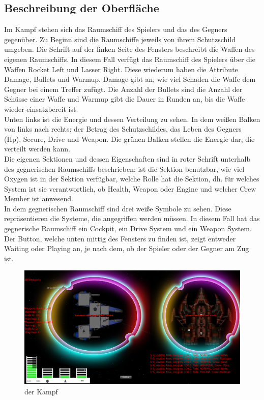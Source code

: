 \documentclass[fontsize=12pt,paper=a4,twoside]{scrartcl}
\begin{document}
\subsection{Beschreibung der Oberfläche}
Im Kampf stehen sich das Raumschiff des Spielers und das des Gegners gegenüber.
Zu Beginn sind die Raumschiffe jeweils von ihrem Schutzschild umgeben.
Die Schrift auf der linken Seite des Fensters beschreibt die Waffen des eigenen Raumschiffs.
In diesem Fall verfügt das Raumschiff des Spielers über die Waffen Rocket Left und Lasser Right.
Diese wiederum haben die Attribute Damage, Bullets und Warmup. Damage gibt an, wie viel Schaden die Waffe dem Gegner bei einem Treffer zufügt. Die Anzahl der Bullets sind
die Anzahl der Schüsse einer Waffe und Warmup gibt die Dauer in Runden an, bis die Waffe wieder einsatzbereit ist.\\

Unten links ist die Energie und dessen Verteilung zu sehen. In dem weißen Balken von links nach rechts: der Betrag des Schutzschildes, das Leben des Gegners (Hp), Secure, Drive und Weapon.
Die grünen Balken stellen die Energie dar, die verteilt werden kann.\\

Die eigenen Sektionen und dessen Eigenschaften sind in roter Schrift unterhalb des gegnerischen Raumschiffs beschrieben: ist die Sektion benutzbar, wie viel Oxygen ist in der Sektion verfügbar, welche Rolle hat die Sektion, dh. für welches System ist sie verantwortlich, ob Health, Weapon oder Engine und welcher Crew Member ist anwesend.\\

In dem gegnerischen Raumschiff sind drei weiße Symbole zu sehen. Diese repräsentieren die Systeme, die angegriffen werden müssen. In diesem Fall hat das gegnerische Raumschiff
ein Cockpit, ein Drive System und ein Weapon System.\\ 

Der Button, welche unten mittig des Fensters zu finden ist, zeigt entweder Waiting oder Playing an,
je nach dem, ob der Spieler oder der Gegner am Zug ist.

\begin{figure}[htp]
	\centering
	\includegraphics[width=1.00\linewidth]{pics/combatScreenRot01.png}
	\caption{der Kampf}
	\label{fig1}
\end{figure}
\end{document}
